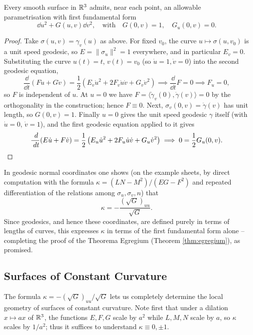 \documentclass[a4paper]{scrartcl}
\begin{document}
\begin{corollary}\label{cor:geodesicnormalcoords}
    Every smooth surface in $\mathbb{R}^3$ admits, near each point, an allowable parametrisation with first fundamental form
    $$
    \dd u^2 + G(u, v) \dd v^2, \quad \text{with} \quad G(0, v) = 1, \quad G_u(0, v) = 0.
    $$
\end{corollary}
\begin{proof}
    Take $\sigma(u, v) = \gamma_v(u)$ as above. For fixed $v_0$, the curve $u \mapsto \sigma(u, v_0)$ is a unit speed geodesic, so $E = \|\sigma_u\|^2 = 1$ everywhere, and in particular $E_v = 0$. Substituting the curve $u(t) = t$, $v(t) = v_0$ (so $\dot u = 1, \dot v = 0$) into the second geodesic equation,
    $$
    \frac{\dd}{\dd t}\left(F \dot u + G \dot v\right) = \frac{1}{2}\left(E_v \dot u^2 + 2 F_v \dot u \dot v + G_v \dot v^2\right) \implies \frac{\dd}{\dd t} F = 0 \implies F_u = 0,
    $$
    so $F$ is independent of $u$. At $u = 0$ we have $F = \langle \dot\gamma_v(0), \dot\gamma(v)\rangle = 0$ by the orthogonality in the construction; hence $F \equiv 0$. Next, $\sigma_v(0, v) = \dot\gamma(v)$ has unit length, so $G(0, v) = 1$. Finally $u = 0$ gives the unit speed geodesic $\gamma$ itself (with $\dot u = 0$, $\dot v = 1$), and the first geodesic equation applied to it gives
    $$
    \frac{\; d}{\; d t}(E \dot u + F \dot v) = \frac{1}{2}\left(E_u \dot u^2 + 2F_u \dot u \dot v + G_u \dot v^2\right) \implies 0 = \frac{1}{2}G_u(0, v). \qedhere
    $$
\end{proof}

In geodesic normal coordinates one shows (on the example sheets, by direct computation with the formula $\kappa = (LN - M^2)/(EG - F^2)$ and repeated differentiation of the relations among $\sigma_u, \sigma_v, n$) that
$$
\kappa = -\frac{\left(\sqrt{G}\right)_{uu}}{\sqrt{G}}.
$$
Since geodesics, and hence these coordinates, are defined purely in terms of lengths of curves, this expresses $\kappa$ in terms of the first fundamental form alone -- completing the proof of the Theorema Egregium (Theorem \ref{thm:egregium}), as promised.

\subsection{Surfaces of Constant Curvature}

The formula $\kappa = -(\sqrt{G})_{uu}/\sqrt{G}$ lets us completely determine the local geometry of surfaces of constant curvature. Note first that under a dilation $x \mapsto ax$ of $\mathbb{R}^3$, the functions $E, F, G$ scale by $a^2$ while $L, M, N$ scale by $a$, so $\kappa$ scales by $1/a^2$; thus it suffices to understand $\kappa \equiv 0, \pm 1$.
\end{document}
